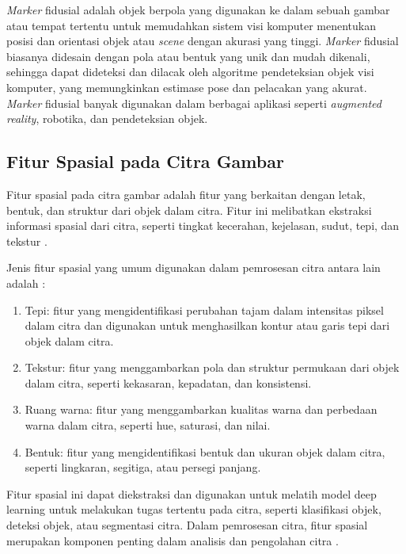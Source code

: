 \emph{Marker} fidusial adalah objek berpola yang digunakan ke dalam sebuah gambar atau tempat tertentu untuk memudahkan sistem visi komputer menentukan posisi dan orientasi objek atau \emph{scene} dengan akurasi yang tinggi. \emph{Marker} fidusial biasanya didesain dengan pola atau bentuk yang unik dan mudah dikenali, sehingga dapat dideteksi dan dilacak oleh algoritme pendeteksian objek visi komputer, yang memungkinkan estimase pose dan pelacakan yang akurat. \emph{Marker} fidusial banyak digunakan dalam berbagai aplikasi seperti \emph{augmented reality}, robotika, dan pendeteksian objek.

\subsection{Fitur Spasial pada Citra Gambar}
Fitur spasial pada citra gambar adalah fitur yang berkaitan dengan letak, bentuk, dan struktur dari objek dalam citra. Fitur ini melibatkan ekstraksi informasi
spasial dari citra, seperti tingkat kecerahan, kejelasan, sudut, tepi, dan tekstur \cite{Gonzalez2009}.

Jenis fitur spasial yang umum digunakan dalam pemrosesan citra antara lain adalah \cite{Gonzalez2009}:

\begin{enumerate}
	\item Tepi: fitur yang mengidentifikasi perubahan tajam dalam intensitas piksel dalam citra dan digunakan untuk menghasilkan kontur atau garis tepi dari objek dalam
	      citra.
	\item Tekstur: fitur yang menggambarkan pola dan struktur permukaan dari objek dalam citra, seperti kekasaran, kepadatan, dan konsistensi.
	\item Ruang warna: fitur yang menggambarkan kualitas warna dan perbedaan warna dalam citra, seperti hue, saturasi, dan nilai.
	\item Bentuk: fitur yang mengidentifikasi bentuk dan ukuran objek dalam citra, seperti lingkaran, segitiga, atau persegi panjang.
\end{enumerate}

Fitur spasial ini dapat diekstraksi dan digunakan untuk melatih model deep learning untuk melakukan tugas tertentu pada citra, seperti klasifikasi objek,
deteksi objek, atau segmentasi citra. Dalam pemrosesan citra, fitur spasial merupakan komponen penting dalam analisis dan pengolahan citra \cite{Gonzalez2009}.

